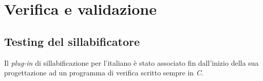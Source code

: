 
\chapter{Verifica e validazione}
\label{cap:verifica-validazione}
\section{Testing del sillabificatore}
Il \textit{plug-in} di sillabificazione per l'italiano è stato associato fin dall'inizio della sua
progettazione ad un programma di verifica scritto sempre in \textit{C}. \\
